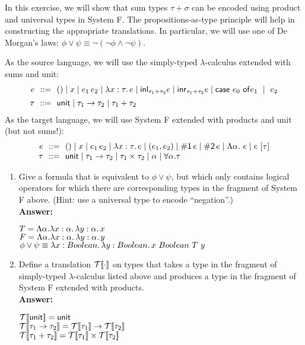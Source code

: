 \documentclass[10pt]{article}
\begin{document}
\begin{exercise} 

In this exercise, we will show that sum types $\tau + \sigma$
can be encoded using product and universal types in System F. The
propositions-as-type principle will help in constructing the
appropriate translations. In particular, we will use one of De
Morgan's laws: $\phi \vee \psi \equiv \neg (\neg \phi \wedge \neg \psi)$.

As the source language, we will use the simply-typed
$\lambda$-calculus extended with sums and unit:
%
\[
\begin{array}{r@{~~}c@{~~}l}
e    &::=& () \mid x \mid e_1\,e_2 \mid \lam{x:\tau}{e} \mid
           \lamfnt{inl}_{\tau_1+\tau_2} e \mid \lamfnt{inr}_{\tau_1+\tau_2} e \mid \lamfnt{case}~e_0~\lamfnt{of}e_1~\mid~{e_2}\\[1ex]
\tau &::=& \lamfnt{unit} \mid \tau_1 \arrow \tau_2 \mid \tau_1 + \tau_2\\
\end{array}
\]
%
As the target language, we will use System F extended with products
and unit (but not sums!):
%
\[
\begin{array}{r@{~~}c@{~~}l}
e    &::=& () \mid x \mid e_1\,e_2 \mid \lam{x:\tau}{e} \mid
           (e_1, e_2) \mid \lamfnt{\#1}\,e \mid \lamfnt{\#2}\,e \mid 
           \Lambda \alpha.~e \mid e~[\tau] \\
\tau &::=& \lamfnt{unit} \mid \tau_1 \arrow \tau_2 \mid \tau_1 \times \tau_2 \mid \alpha \mid \forall \alpha . \tau\\
\end{array}
\]

\begin{enumerate}
\item Give a formula that is equivalent to $\phi \vee \psi$, but which
  only contains logical operators for which there are corresponding
  types in the fragment of System F above.  (Hint: use a universal
  type to encode ``negation''.) \\[0.1cm]
\noindent \textbf{Answer:}
\begin{center}
	$T = \Lambda \alpha.\lambda x:\alpha.\,\lambda y:\alpha.\,x$ \\
	$F = \Lambda \alpha.\lambda x:\alpha.\,\lambda y:\alpha.\,y$ \\
	$\phi \vee \psi \equiv \lambda x:Boolean.\,\lambda y:Boolean.\,x\ Boolean\ T\ y$
\end{center}

\item Define a translation ${\cal T}[\![\cdot]\!]$ on types that takes a type
  in the fragment of simply-typed $\lambda$-calculus listed above and
  produces a type in the fragment of System F extended with products.\\[0.1cm]
\noindent \textbf{Answer:}
\begin{center}
	${\cal T}[\![\mathsf{unit}]\!] = \mathsf{unit}$\\
	${\cal T}[\![\tau_1 \rightarrow \tau_2]\!] = {\cal T}[\![\tau_1]\!] \rightarrow {\cal T}[\![\tau_2]\!]$ \\
	${\cal T}[\![\tau_1 + \tau_2]\!] = {\cal T}[\![\tau_1]\!] \times {\cal T}[\![\tau_2]\!]$
\end{center}


\end{enumerate}
\end{exercise}
\end{document}
